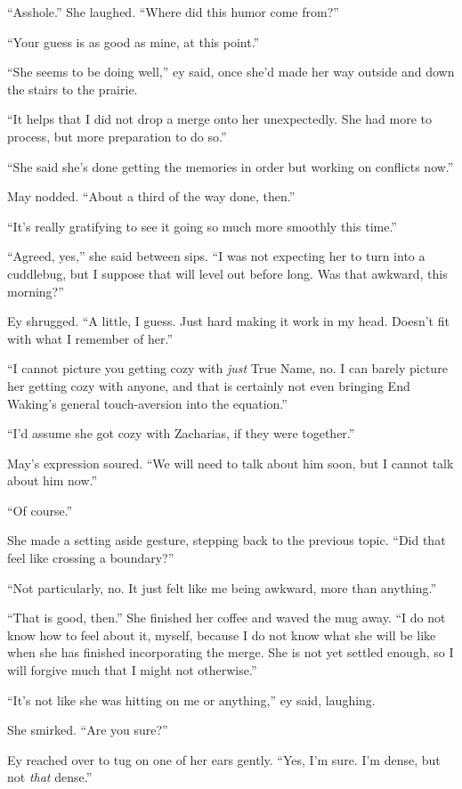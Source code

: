 ``Asshole.'' She laughed. ``Where did this humor come from?''

``Your guess is as good as mine, at this point.''

``She seems to be doing well,'' ey said, once she'd made her way outside and down the stairs to the prairie.

``It helps that I did not drop a merge onto her unexpectedly. She had more to process, but more preparation to do so.''

``She said she's done getting the memories in order but working on conflicts now.''

May nodded. ``About a third of the way done, then.''

``It's really gratifying to see it going so much more smoothly this time.''

``Agreed, yes,'' she said between sips. ``I was not expecting her to turn into a cuddlebug, but I suppose that will level out before long. Was that awkward, this morning?''

Ey shrugged. ``A little, I guess. Just hard making it work in my head. Doesn't fit with what I remember of her.''

``I cannot picture you getting cozy with \emph{just} True Name, no. I can barely picture her getting cozy with anyone, and that is certainly not even bringing End Waking's general touch-aversion into the equation.''

``I'd assume she got cozy with Zacharias, if they were together.''

May's expression soured. ``We will need to talk about him soon, but I cannot talk about him now.''

``Of course.''

She made a setting aside gesture, stepping back to the previous topic. ``Did that feel like crossing a boundary?''

``Not particularly, no. It just felt like me being awkward, more than anything.''

``That is good, then.'' She finished her coffee and waved the mug away. ``I do not know how to feel about it, myself, because I do not know what she will be like when she has finished incorporating the merge. She is not yet settled enough, so I will forgive much that I might not otherwise.''

``It's not like she was hitting on me or anything,'' ey said, laughing.

She smirked. ``Are you sure?''

Ey reached over to tug on one of her ears gently. ``Yes, I'm sure. I'm dense, but not \emph{that} dense.''

